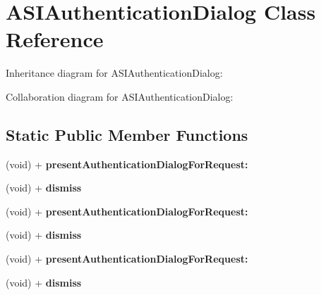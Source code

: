 \hypertarget{interface_a_s_i_authentication_dialog}{
\section{\-A\-S\-I\-Authentication\-Dialog \-Class \-Reference}
\label{interface_a_s_i_authentication_dialog}
}


\-Inheritance diagram for \-A\-S\-I\-Authentication\-Dialog\-:


\-Collaboration diagram for \-A\-S\-I\-Authentication\-Dialog\-:
\subsection*{\-Static \-Public \-Member \-Functions}
\begin{DoxyCompactItemize}
\item 
\hypertarget{interface_a_s_i_authentication_dialog_a07eb1b70ffa5f5279a32a23f3e1de378}{
(void) + {\bfseries present\-Authentication\-Dialog\-For\-Request\-:}}
\label{interface_a_s_i_authentication_dialog_a07eb1b70ffa5f5279a32a23f3e1de378}

\item 
\hypertarget{interface_a_s_i_authentication_dialog_a56735bd2a28feda5aa645dbd7bf7b180}{
(void) + {\bfseries dismiss}}
\label{interface_a_s_i_authentication_dialog_a56735bd2a28feda5aa645dbd7bf7b180}

\item 
\hypertarget{interface_a_s_i_authentication_dialog_a07eb1b70ffa5f5279a32a23f3e1de378}{
(void) + {\bfseries present\-Authentication\-Dialog\-For\-Request\-:}}
\label{interface_a_s_i_authentication_dialog_a07eb1b70ffa5f5279a32a23f3e1de378}

\item 
\hypertarget{interface_a_s_i_authentication_dialog_a56735bd2a28feda5aa645dbd7bf7b180}{
(void) + {\bfseries dismiss}}
\label{interface_a_s_i_authentication_dialog_a56735bd2a28feda5aa645dbd7bf7b180}

\item 
\hypertarget{interface_a_s_i_authentication_dialog_a07eb1b70ffa5f5279a32a23f3e1de378}{
(void) + {\bfseries present\-Authentication\-Dialog\-For\-Request\-:}}
\label{interface_a_s_i_authentication_dialog_a07eb1b70ffa5f5279a32a23f3e1de378}

\item 
\hypertarget{interface_a_s_i_authentication_dialog_a56735bd2a28feda5aa645dbd7bf7b180}{
(void) + {\bfseries dismiss}}
\label{interface_a_s_i_authentication_dialog_a56735bd2a28feda5aa645dbd7bf7b180}


\end{DoxyCompactItemize}
